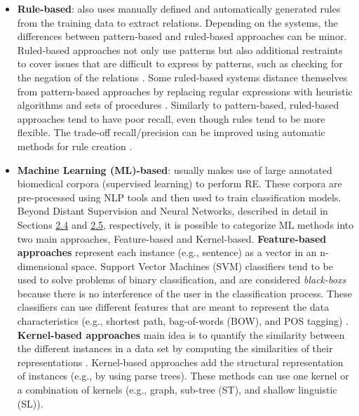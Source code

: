 \begin{itemize}
\item{\textbf{Rule-based}: also uses manually defined and automatically generated rules from the training data to extract relations. Depending on the systems, the differences between pattern-based and ruled-based approaches can be minor. Ruled-based approaches not only use patterns but also additional restraints to cover issues that are difficult to express by patterns, such as checking for the negation of the relations \citep{10.1093/bioinformatics/bti084}. Some ruled-based systems distance themselves from pattern-based approaches by replacing regular expressions with heuristic algorithms and sets of procedures \citep{Rinaldi:2007:MRP:1224550.1224593}. Similarly to pattern-based, ruled-based approaches tend to have poor recall, even though rules tend to be more flexible. The trade-off recall/precision can be improved using automatic methods for rule creation \citep{10.1136/amiajnl-2011-000776}.}

\item{\textbf{Machine Learning (ML)-based}: usually makes use of large annotated biomedical corpora (supervised learning) to perform RE. These corpora are pre-processed using NLP tools and then used to train classification models. Beyond Distant Supervision and Neural Networks, described in detail in Sections \hyperlink{2.4}{2.4} and \hyperlink{2.5}{2.5}, respectively, it is possible to categorize ML methods into two main approaches, Feature-based and Kernel-based. \textbf{Feature-based approaches} represent each instance (e.g., sentence) as a vector in an n-dimensional space. Support Vector Machines (SVM) classifiers tend to be used to solve problems of binary classification, and are considered \textit{black-boxs} because there is no interference of the user in the classification process. These classifiers can use different features that are meant to represent the data characteristics (e.g., shortest path, bag-of-words (BOW), and POS tagging) \citep{Kim2008DetectionOG}. \textbf{Kernel-based approaches} main idea is to quantify the similarity between the different instances in a data set by computing the similarities of their representations \citep{Giuliano06exploitingshallow}. Kernel-based approaches add the structural representation of instances (e.g., by using parse trees). These methods can use one kernel or a combination of kernels (e.g., graph, sub-tree (ST), and shallow linguistic (SL)).}

\end{itemize}


